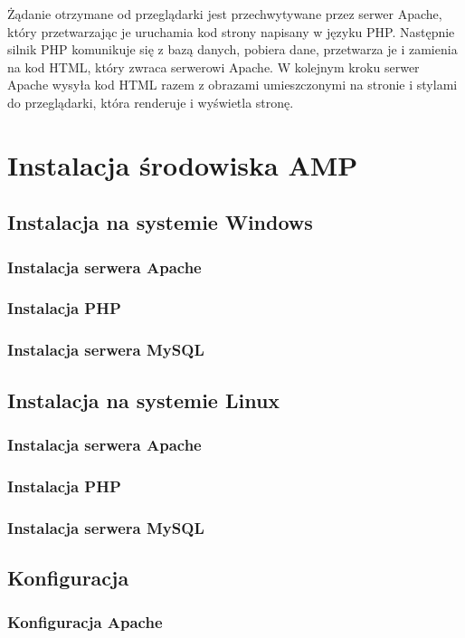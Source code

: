 \documentclass[a4paper,10pt]{article}
\begin{document}
Żądanie otrzymane od przeglądarki jest przechwytywane przez serwer Apache, który przetwarzając je uruchamia kod strony napisany w języku PHP. Następnie silnik PHP  komunikuje się z bazą danych, pobiera dane, przetwarza je i zamienia na kod HTML, który zwraca serwerowi Apache. W kolejnym kroku serwer Apache wysyła kod HTML razem z obrazami umieszczonymi na stronie i stylami do przeglądarki, która renderuje i wyświetla stronę.

\section{Instalacja środowiska AMP}
\subsection{Instalacja na systemie Windows}
\subsubsection{Instalacja serwera Apache}
\subsubsection{Instalacja PHP}
\subsubsection{Instalacja serwera MySQL}
\subsection{Instalacja na systemie Linux}
\subsubsection{Instalacja serwera Apache}
\subsubsection{Instalacja PHP}
\subsubsection{Instalacja serwera MySQL}
\subsection{Konfiguracja}
\subsubsection{Konfiguracja Apache}
\end{document}
